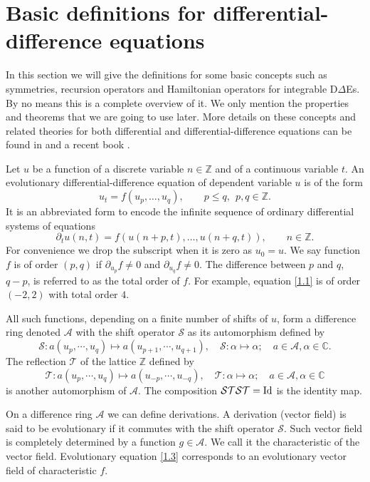 \documentclass[fleqn,11pt,twoside]{article}
\newcommand\cS{{\mathcal S}}
\newcommand\cA{{\mathcal A}}
\newcommand\cT{{\mathcal T}}
\newcommand{\field}[1]{\mathbb{#1}}
\newcommand{\C}{\field{C}}
\newcommand{\Z}{\field{Z}}
\theoremstyle{definition}
\begin{document}
\section{Basic definitions for differential-difference equations}\label{Sec1}
	In this section we will give the definitions for some basic
concepts such as symmetries, recursion operators and Hamiltonian operators for integrable D$\Delta$Es.
By no means this is a complete overview of it. We only
mention the properties and theorems that we are going to use later.
More details on these concepts and related theories for both differential and differential-difference equations
can be found in \cite{52, 19} and a recent book \cite{b12}.

Let $u$ be  a function of a discrete variable $n \in
\mathbb{Z}$ and of a continuous variable $t$.
An evolutionary differential-difference
equation of dependent variable $u$ is of the form
	\begin{equation}
		u_t = f(u_p,\ldots,u_q),\qquad p\le q,\ \ p,q\in\mathbb{Z}.
		\label{1.3}
	\end{equation}
It is an abbreviated form to encode the infinite
sequence of ordinary differential systems of equations
\begin{equation*}
 \partial _t u(n,t)=f(u(n+p,t),\ldots,u(n+q,t)),\qquad
n\in\mathbb{Z}.
\end{equation*}
For convenience we drop the subscript when it is zero as $u_0 = u$.
We say function $f$ is of order $(p, q)$ if $\partial_{u_p} f\neq 0$ and $\partial_{u_q} f\neq 0$.
The difference between $p$ and $q$, $q-p$, is referred to as the total order of $f$. For example, equation \eqref{1.1} is of order $(-2, 2)$
with total order $4$.

All such functions, depending on a finite number of shifts of $u$, form a difference ring denoted $\mathcal{A}$ with the shift operator $\cS$ as its
automorphism defined by
$$
\cS:a(u_p, \cdots, u_q)\mapsto a(u_{p+1}, \cdots, u_{q+1}),\quad \cS:\alpha\mapsto \alpha; \quad a\in \cA,  \alpha\in \C.
$$
The reflection $\cT$ of the lattice $\Z$
defined by
\begin{equation}\label{autoT}
\cT:a(u_p, \cdots, u_q)\mapsto a(u_{-p}, \cdots, u_{-q}),\quad \cT:\alpha\mapsto \alpha; \quad a\in \cA,  \alpha\in \C
\end{equation}
is another automorphism of $\cA$. The composition $\cS\cT\cS\cT= {\rm Id}$ is the identity map.

On a difference ring $\mathcal{A}$ we can define derivations. A derivation (vector field) is said to be evolutionary if it commutes with the shift operator
$\cS$. Such vector field is completely determined by a function $g \in \mathcal{A}$. We call it the
characteristic of the vector field. Evolutionary equation \eqref{1.3} corresponds to an evolutionary vector field of characteristic $f$.
\end{document}
